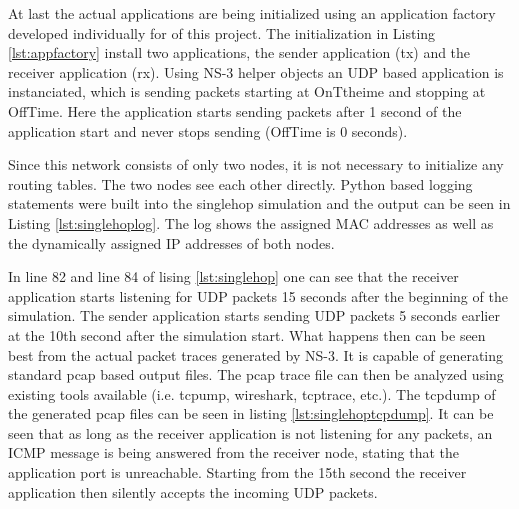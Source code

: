 At last the actual applications are being initialized using an application
factory developed individually for of this project. The initialization
in Listing \ref{lst:appfactory} install two applications, the sender
application (tx) and the receiver application (rx). Using NS-3 helper
objects an UDP based application is instanciated, which is sending
packets starting at OnTtheime and stopping at OffTime. Here the application
starts sending packets after 1 second of the application start and
never stops sending (OffTime is 0 seconds).

\texttt{\small }{\small \par}

Since this network consists of only two nodes, it is not necessary
to initialize any routing tables. The two nodes see each other directly.
Python based logging statements were built into the singlehop simulation
and the output can be seen in Listing \ref{lst:singlehoplog}. The
log shows the assigned MAC addresses as well as the dynamically assigned
IP addresses of both nodes.

\texttt{\small }{\small \par}

In line 82 and line 84 of lising \ref{lst:singlehop} one can see
that the receiver application starts listening for UDP packets 15
seconds after the beginning of the simulation. The sender application
starts sending UDP packets 5 seconds earlier at the 10th second after
the simulation start. What happens then can be seen best from the
actual packet traces generated by NS-3. It is capable of generating
standard pcap based output files. The pcap trace file can then be
analyzed using existing tools available (i.e. tcpump, wireshark, tcptrace,
etc.). The tcpdump of the generated pcap files can be seen in listing
\ref{lst:singlehoptcpdump}. It can be seen that as long as the receiver
application is not listening for any packets, an ICMP message is being
answered from the receiver node, stating that the application port
is unreachable. Starting from the 15th second the receiver application
then silently accepts the incoming UDP packets.

\texttt{\small }{\small \par}



